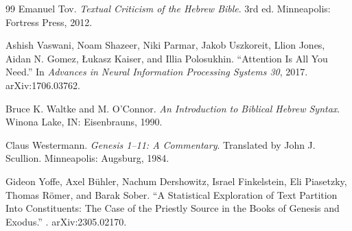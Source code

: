 \begin{thebibliography}{99}
Emanuel Tov.
\newblock \textit{Textual Criticism of the Hebrew Bible}.
\newblock 3rd ed. Minneapolis: Fortress Press, 2012.

Ashish Vaswani, Noam Shazeer, Niki Parmar, Jakob Uszkoreit, Llion Jones,
Aidan N. Gomez, Łukasz Kaiser, and Illia Polosukhin.
\newblock ``Attention Is All You Need.''
\newblock In \textit{Advances in Neural Information Processing Systems 30}, 2017.
\newblock arXiv:1706.03762.

Bruce K. Waltke and M. O'Connor.
\newblock \textit{An Introduction to Biblical Hebrew Syntax}.
\newblock Winona Lake, IN: Eisenbrauns, 1990.

Claus Westermann.
\newblock \textit{Genesis 1--11: A Commentary}.
\newblock Translated by John J. Scullion.
\newblock Minneapolis: Augsburg, 1984.

Gideon Yoffe, Axel Bühler, Nachum Dershowitz, Israel Finkelstein,
Eli Piasetzky, Thomas Römer, and Barak Sober.
\newblock ``A Statistical Exploration of Text Partition Into Constituents:
The Case of the Priestly Source in the Books of Genesis and Exodus.''
.
\newblock arXiv:2305.02170.

\end{thebibliography}



